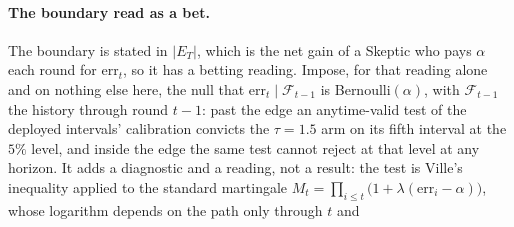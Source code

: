 \paragraph{The boundary read as a bet.} The boundary is stated in $|E_T|$, which is the net gain
of a Skeptic who pays $\alpha$ each round for $\mathrm{err}_t$, so it has a betting reading.
Impose, for that reading alone and on nothing else here, the null that $\mathrm{err}_t \mid
\mathcal{F}_{t-1}$ is Bernoulli$(\alpha)$, with $\mathcal{F}_{t-1}$ the history through round
$t-1$: past the edge an anytime-valid test of the deployed intervals' calibration convicts the
$\tau = 1.5$ arm on its fifth interval at the $5\%$ level, and inside the edge the same test
cannot reject at that level at any horizon. It adds a diagnostic and a reading, not a result: the
test is Ville's inequality applied to the standard martingale $M_t = \prod_{i \le t}\big(1 +
\lambda(\mathrm{err}_i - \alpha)\big)$, whose logarithm depends on the path only through $t$ and
